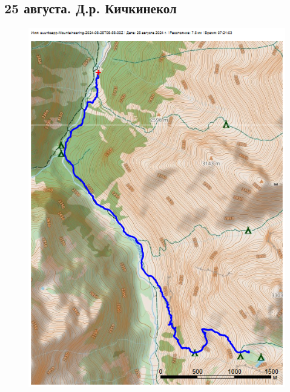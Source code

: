 \subsection{25 августа. Д.р. Кичкинекол}

\begin{figure}[h!]
	\centering
	\includegraphics[angle=0, width=0.7\linewidth]{../pics/mini_maps/25}
	\label{fig:mini_25}
\end{figure}

\newpage